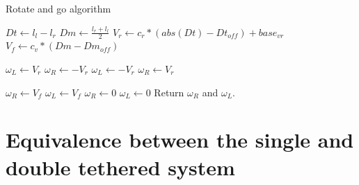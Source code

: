 \documentclass[journal]{IEEEtran}
\begin{document}
\begin{algorithm}[]
\caption{Rotate and go algorithm}
\begin{algorithmic}
\STATE $Dt \gets l_l - l_r$
\STATE $Dm \gets \frac{l_r+l_l}{2}$
\STATE $V_r \gets c_r * (abs(Dt) - Dt_{off}) + base_{vr}$ 
\STATE $V_f \gets c_v * (Dm - Dm_{off})$

\STATE $\omega_{L} \gets V_r$
\STATE $\omega_{R} \gets -V_r$
\ELSE
\STATE $\omega_{L} \gets -V_r$
\STATE $\omega_{R} \gets V_r$
\ENDIF

\ELSE
{}
\STATE $\omega_{R} \gets V_f$
\STATE $\omega_{L} \gets V_f$
\ELSE
\STATE $\omega_{R} \gets 0$
\STATE $\omega_{L} \gets 0$
\ENDIF
\ENDIF
\STATE Return $\omega_{R}$ and $\omega_{L}$.
\end{algorithmic}
\label{alg:rotateandgoalg}
\end{algorithm}

\section{Equivalence between the single and double tethered system} \label{development}
\end{document}
